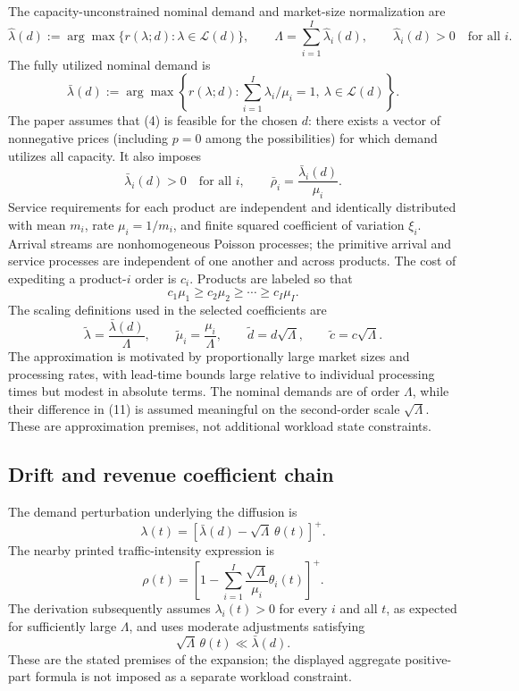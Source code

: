 \documentclass[11pt]{article}
\begin{document}
The capacity-unconstrained nominal demand and market-size normalization are
\[
\hat\lambda(d):=\arg\max\{r(\lambda;d):\lambda\in\mathcal L(d)\},
\qquad
\Lambda=\sum_{i=1}^I\hat\lambda_i(d),
\qquad
\hat\lambda_i(d)>0\quad\text{for all }i.
\]
The fully utilized nominal demand is
\begin{equation}
\bar\lambda(d):=\arg\max\left\{
 r(\lambda;d):\sum_{i=1}^I\lambda_i/\mu_i=1,
 \ \lambda\in\mathcal L(d)\right\}.
\tag{4}
\end{equation}
The paper assumes that (4) is feasible for the chosen \(d\): there exists a vector of nonnegative prices (including \(p=0\) among the possibilities) for which demand utilizes all capacity. It also imposes
\[
\bar\lambda_i(d)>0\quad\text{for all }i,
\qquad
\bar\rho_i=\frac{\bar\lambda_i(d)}{\mu_i}.
\]
Service requirements for each product are independent and identically distributed with mean \(m_i\), rate \(\mu_i=1/m_i\), and finite squared coefficient of variation \(\xi_i\). Arrival streams are nonhomogeneous Poisson processes; the primitive arrival and service processes are independent of one another and across products. The cost of expediting a product-\(i\) order is \(c_i\). Products are labeled so that
\[
c_1\mu_1\geq c_2\mu_2\geq\cdots\geq c_I\mu_I.
\]
The scaling definitions used in the selected coefficients are
\[
\tilde\lambda=\frac{\bar\lambda(d)}{\Lambda},
\qquad \tilde\mu_i=\frac{\mu_i}{\Lambda},
\qquad \tilde d=d\sqrt\Lambda,
\qquad \tilde c=c\sqrt\Lambda.
\]
The approximation is motivated by proportionally large market sizes and processing rates, with lead-time bounds large relative to individual processing times but modest in absolute terms. The nominal demands are of order \(\Lambda\), while their difference in (11) is assumed meaningful on the second-order scale \(\sqrt\Lambda\). These are approximation premises, not additional workload state constraints.

\subsection*{Drift and revenue coefficient chain}

The demand perturbation underlying the diffusion is
\begin{equation}
\lambda(t)=[\bar\lambda(d)-\sqrt\Lambda\,\theta(t)]^+.
\tag{5}
\end{equation}
The nearby printed traffic-intensity expression is
\[
\rho(t)=\left[1-\sum_{i=1}^I
\frac{\sqrt\Lambda}{\mu_i}\theta_i(t)\right]^+.
\]
The derivation subsequently assumes \(\lambda_i(t)>0\) for every \(i\) and all \(t\), as expected for sufficiently large \(\Lambda\), and uses moderate adjustments satisfying
\[
\sqrt\Lambda\,\theta(t)\ll\bar\lambda(d).
\]
These are the stated premises of the expansion; the displayed aggregate positive-part formula is not imposed as a separate workload constraint.
\end{document}
